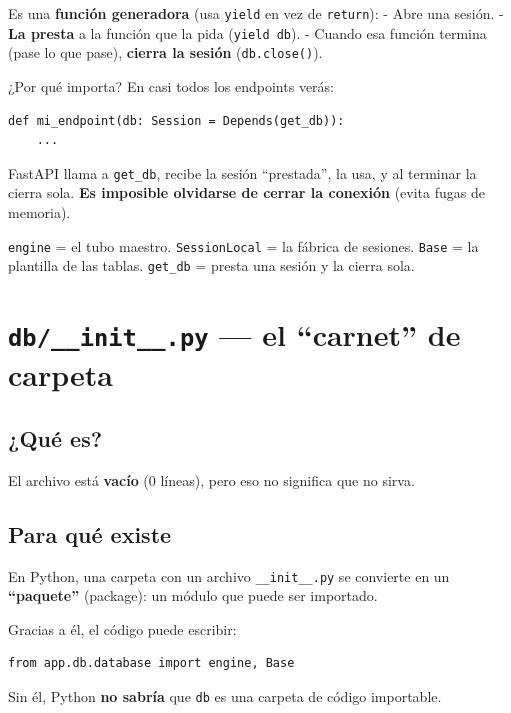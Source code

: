 \documentclass[11pt,a4paper]{article}
\begin{document}
Es una \textbf{función generadora} (usa \texttt{yield} en vez de \texttt{return}):
- Abre una sesión.
- \textbf{La presta} a la función que la pida (\texttt{yield db}).
- Cuando esa función termina (pase lo que pase), \textbf{cierra la sesión} (\texttt{db.close()}).

¿Por qué importa? En casi todos los endpoints verás:

\begin{lstlisting}
def mi_endpoint(db: Session = Depends(get_db)):
    ...
\end{lstlisting}

FastAPI llama a \texttt{get\_db}, recibe la sesión ``prestada'', la usa, y al terminar la cierra
sola. \textbf{Es imposible olvidarse de cerrar la conexión} (evita fugas de memoria).

\begin{recuadro}
\texttt{engine} = el tubo maestro. \texttt{SessionLocal} = la fábrica de sesiones.
\texttt{Base} = la plantilla de las tablas. \texttt{get\_db} = presta una sesión y la cierra sola.
\end{recuadro}

\section{\texttt{db/\_\_init\_\_.py} --- el ``carnet'' de carpeta}

\subsection{¿Qué es?}

El archivo está \textbf{vacío} (0 líneas), pero eso no significa que no sirva.

\subsection{Para qué existe}

En Python, una carpeta con un archivo \texttt{\_\_init\_\_.py} se convierte en un
\textbf{``paquete''} (package): un módulo que puede ser importado.

Gracias a él, el código puede escribir:

\begin{lstlisting}
from app.db.database import engine, Base
\end{lstlisting}

Sin él, Python \textbf{no sabría} que \texttt{db} es una carpeta de código importable.
\end{document}
